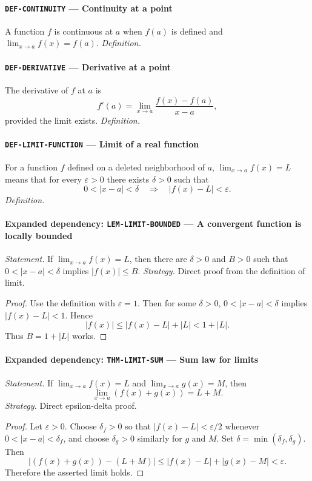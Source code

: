 \documentclass[10pt]{article}
\newcommand{\pidraw}[1]{\begingroup\urlstyle{tt}\nolinkurl{#1}\endgroup}
\theoremstyle{definition}
\theoremstyle{remark}
\begin{document}
\paragraph{\pidraw{DEF-CONTINUITY} --- Continuity at a point}
A function $f$ is continuous at $a$ when $f(a)$ is defined and $\lim_{x\to a}f(x)=f(a)$.
\textit{Definition.}

\paragraph{\pidraw{DEF-DERIVATIVE} --- Derivative at a point}
The derivative of $f$ at $a$ is
\[
f'(a)=\lim_{x\to a}\frac{f(x)-f(a)}{x-a},
\]
provided the limit exists.
\textit{Definition.}

\paragraph{\pidraw{DEF-LIMIT-FUNCTION} --- Limit of a real function}
For a function $f$ defined on a deleted neighborhood of $a$, $\lim_{x\to a}f(x)=L$ means that for every $\varepsilon>0$ there exists $\delta>0$ such that
\[
0<|x-a|<\delta\quad\Longrightarrow\quad |f(x)-L|<\varepsilon.
\]
\textit{Definition.}

\paragraph{Expanded dependency: \pidraw{LEM-LIMIT-BOUNDED} --- A convergent function is locally bounded}
\textit{Statement.} If $\lim_{x\to a}f(x)=L$, then there are $\delta>0$ and $B>0$ such that
$0<|x-a|<\delta$ implies $|f(x)|\le B$.
\textit{Strategy.} Direct proof from the definition of limit.
\begin{proof}Use the definition with $\varepsilon=1$. Then for some $\delta>0$,
$0<|x-a|<\delta$ implies $|f(x)-L|<1$. Hence
\[
|f(x)|\le |f(x)-L|+|L|<1+|L|.
\]
Thus $B=1+|L|$ works.\end{proof}

\paragraph{Expanded dependency: \pidraw{THM-LIMIT-SUM} --- Sum law for limits}
\textit{Statement.} If $\lim_{x\to a}f(x)=L$ and $\lim_{x\to a}g(x)=M$, then
\[
\lim_{x\to a}(f(x)+g(x))=L+M.
\]
\textit{Strategy.} Direct epsilon-delta proof.
\begin{proof}Let $\varepsilon>0$. Choose $\delta_f>0$ so that
$|f(x)-L|<\varepsilon/2$ whenever $0<|x-a|<\delta_f$, and choose
$\delta_g>0$ similarly for $g$ and $M$. Set
$\delta=\min(\delta_f,\delta_g)$. Then
\[
|(f(x)+g(x))-(L+M)|
\le |f(x)-L|+|g(x)-M|<\varepsilon.
\]
Therefore the asserted limit holds.\end{proof}
\end{document}
